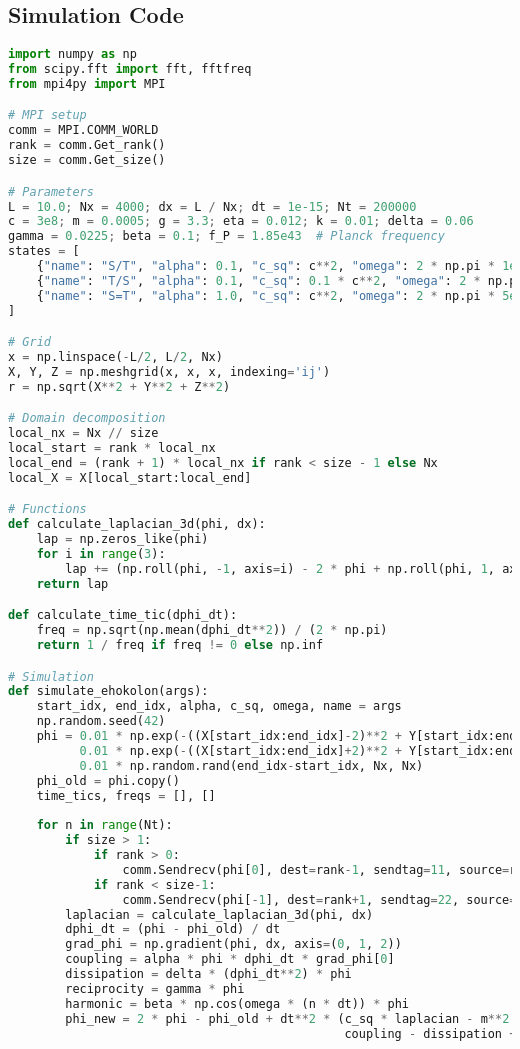 \documentclass[11pt]{article}
\begin{document}
\subsection{Simulation Code}
\begin{lstlisting}[language=Python, caption={Time Quantization Simulation}, label=lst:time_quant]
import numpy as np
from scipy.fft import fft, fftfreq
from mpi4py import MPI

# MPI setup
comm = MPI.COMM_WORLD
rank = comm.Get_rank()
size = comm.Get_size()

# Parameters
L = 10.0; Nx = 4000; dx = L / Nx; dt = 1e-15; Nt = 200000
c = 3e8; m = 0.0005; g = 3.3; eta = 0.012; k = 0.01; delta = 0.06
gamma = 0.0225; beta = 0.1; f_P = 1.85e43  # Planck frequency
states = [
    {"name": "S/T", "alpha": 0.1, "c_sq": c**2, "omega": 2 * np.pi * 1e-4},
    {"name": "T/S", "alpha": 0.1, "c_sq": 0.1 * c**2, "omega": 2 * np.pi * f_P},
    {"name": "S=T", "alpha": 1.0, "c_sq": c**2, "omega": 2 * np.pi * 5e14}
]

# Grid
x = np.linspace(-L/2, L/2, Nx)
X, Y, Z = np.meshgrid(x, x, x, indexing='ij')
r = np.sqrt(X**2 + Y**2 + Z**2)

# Domain decomposition
local_nx = Nx // size
local_start = rank * local_nx
local_end = (rank + 1) * local_nx if rank < size - 1 else Nx
local_X = X[local_start:local_end]

# Functions
def calculate_laplacian_3d(phi, dx):
    lap = np.zeros_like(phi)
    for i in range(3):
        lap += (np.roll(phi, -1, axis=i) - 2 * phi + np.roll(phi, 1, axis=i)) / dx**2
    return lap

def calculate_time_tic(dphi_dt):
    freq = np.sqrt(np.mean(dphi_dt**2)) / (2 * np.pi)
    return 1 / freq if freq != 0 else np.inf

# Simulation
def simulate_ehokolon(args):
    start_idx, end_idx, alpha, c_sq, omega, name = args
    np.random.seed(42)
    phi = 0.01 * np.exp(-((X[start_idx:end_idx]-2)**2 + Y[start_idx:end_idx]**2 + Z[start_idx:end_idx]**2)/0.1**2) * np.cos(5*X[start_idx:end_idx]) + \
          0.01 * np.exp(-((X[start_idx:end_idx]+2)**2 + Y[start_idx:end_idx]**2 + Z[start_idx:end_idx]**2)/0.1**2) * np.cos(5*X[start_idx:end_idx]) + \
          0.01 * np.random.rand(end_idx-start_idx, Nx, Nx)
    phi_old = phi.copy()
    time_tics, freqs = [], []
    
    for n in range(Nt):
        if size > 1:
            if rank > 0:
                comm.Sendrecv(phi[0], dest=rank-1, sendtag=11, source=rank-1, recvtag=22)
            if rank < size-1:
                comm.Sendrecv(phi[-1], dest=rank+1, sendtag=22, source=rank+1, recvtag=11)
        laplacian = calculate_laplacian_3d(phi, dx)
        dphi_dt = (phi - phi_old) / dt
        grad_phi = np.gradient(phi, dx, axis=(0, 1, 2))
        coupling = alpha * phi * dphi_dt * grad_phi[0]
        dissipation = delta * (dphi_dt**2) * phi
        reciprocity = gamma * phi
        harmonic = beta * np.cos(omega * (n * dt)) * phi
        phi_new = 2 * phi - phi_old + dt**2 * (c_sq * laplacian - m**2 * phi - g * phi**3 - eta * phi**5 + 
                                               coupling - dissipation + reciprocity - harmonic + 8 * np.pi * G * k * phi**2)
        

\end{lstlisting}
\end{document}
